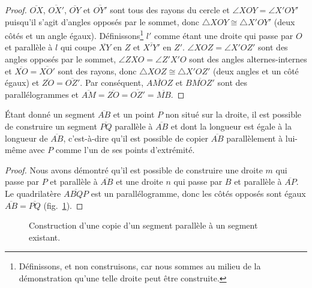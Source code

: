 \begin{proof}
$\overline{OX}$, $\overline{OX'}$, $\overline{OY}$ et $\overline{OY'}$ sont tous des rayons du cercle et $\angle XOY = \angle X'OY'$ puisqu'il s'agit d'angles opposés par le sommet, donc $\triangle XOY\cong\triangle X'OY'$ (deux côtés et un angle égaux). Définissons\footnote{Définissons, et non construisons, car nous sommes au milieu de la démonstration qu'une telle droite peut être construite.} $l'$ comme étant une droite qui passe par $O$ et parallèle à $l$ qui coupe $\overline{XY}$ en $Z$ et $\overline{X'Y'}$ en $Z'$. $\angle XOZ=\angle X'OZ'$ sont des angles opposés par le sommet, $\angle ZXO=\angle Z'X'O$ sont des angles  alternes-internes et $\overline{XO}=\overline{XO'}$ sont des rayons, donc $\triangle XOZ\cong\triangle X'OZ'$ (deux angles et un côté égaux) et $\overline{ZO}=\overline{OZ'}$. Par conséquent, $\overline{AMOZ}$ et $\overline{BMOZ'}$ sont des parallélogrammes et $\overline{AM}=\overline{ZO}=\overline{OZ'}=\overline{MB}$.
\end{proof}

\begin{theorem}
Étant donné un segment $\overline{AB}$ et un point $P$ non situé sur la droite, il est possible de construire un segment  $\overline{PQ}$ parallèle à $\overline{AB}$ et dont la longueur est égale à la longueur de $\overline{AB}$, c'est-à-dire qu'il est possible de copier $\overline{AB}$ parallèlement à lui-même avec $P$ comme l'un de ses points d'extrémité.
\end{theorem}

\begin{proof}
Nous avons démontré qu'il est possible de construire une droite $m$ qui passe par $P$ et parallèle à $\overline{AB}$ et une droite $n$ qui passe par $B$ et parallèle à $\overline{AP}$. Le quadrilatère $\overline{ABQP}$ est un parallélogramme, donc les côtés opposés sont égaux $\overline{AB}=\overline{PQ}$ (fig.~\ref{f.se-parallel-other4}).
\end{proof}

\begin{figure}[htbp]
\centering {}
\caption{Construction d'une copie d'un segment parallèle à un segment  existant.}\label{f.se-parallel-other4}
\end{figure}

